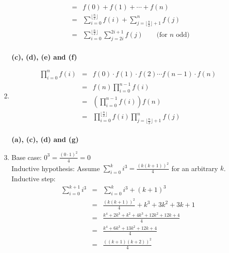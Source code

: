 \documentclass[12pt]{article}
\begin{document}
\begin{enumerate}[1.]
\begin{eqnarray*}
            & = & f(0) + f(1) + \cdots + f(n) \\
            & = & \sum_{i=0}^{\lfloor \frac{n}{2} \rfloor} f(i) + \sum_{j = \lfloor
                \frac{n}{2} \rfloor +1}^{n} f(j) \\
            & = & \sum_{i=0}^{\lfloor \frac{n}{2} \rfloor} \sum_{j=2i}^{2i+1} f(j)
                \qquad \text{(for $n$ odd)}
            \end{eqnarray*} \\ \textbf{(c), (d), (e) and (f)}
        \item \begin{eqnarray*}
            \prod_{i=0}^{n} f(i) & = & f(0) \cdot f(1) \cdot f(2) \cdots f(n-1) \cdot f(n) \\
            & = & f(n) \prod_{i=0}^{n-1} f(i) \\
            & = & \left(\prod_{i=0}^{n-1} f(i)\right) f(n) \\
            & = & \prod_{i=0}^{\lfloor \frac{n}{2} \rfloor} f(i) \prod_{j= \lfloor
                \frac{n}{2} \rfloor +1}^{n} f(j)
            \end{eqnarray*} \\ \textbf{(a), (c), (d) and (g)}
        \item Base case: $\displaystyle 0^3 = \frac{(0 \cdot 1)^2}{4} = 0$ \\
            Inductive hypothesis: Assume $\displaystyle\sum\limits_{i=0}^{k} i^3
                = \frac{(k(k+1))^2}{4}$ for an arbitrary $k$. \\
            Inductive step: \begin{eqnarray*}
                \sum_{i=0}^{k+1} i^3 & = & \sum_{i=0}^{k} i^3 + (k+1)^3 \\
                & = & \frac{(k(k+1))^2}{4} + k^3 + 3k^2 + 3k + 1 \\
                & = & \frac{k^4 + 2k^3 + k^2 + 4k^3 + 12k^2 + 12k + 4}{4} \\
                & = & \frac{k^4 + 6k^3 + 13k^2 + 12k + 4}{4} \\
                & = & \frac{((k+1)(k+2))^2}{4}
            \end{eqnarray*}
    \end{enumerate}
\end{document}
